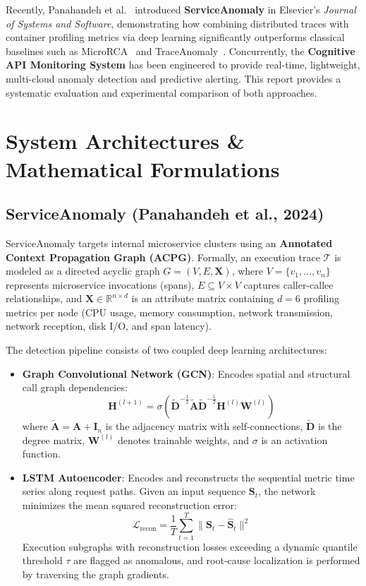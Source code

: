 \documentclass[11pt,a4paper]{article}
\begin{document}
Recently, Panahandeh et al.~\cite{panahandeh2024serviceanomaly} introduced \textbf{ServiceAnomaly} in Elsevier's \textit{Journal of Systems and Software}, demonstrating how combining distributed traces with container profiling metrics via deep learning significantly outperforms classical baselines such as MicroRCA~\cite{wu2020microrca} and TraceAnomaly~\cite{liu2020traceanomaly}. Concurrently, the \textbf{Cognitive API Monitoring System} has been engineered to provide real-time, lightweight, multi-cloud anomaly detection and predictive alerting. This report provides a systematic evaluation and experimental comparison of both approaches.

\section{System Architectures \& Mathematical Formulations}

\subsection{ServiceAnomaly (Panahandeh et al., 2024)}
ServiceAnomaly targets internal microservice clusters using an \textbf{Annotated Context Propagation Graph (ACPG)}. Formally, an execution trace $\mathcal{T}$ is modeled as a directed acyclic graph $G = (V, E, \mathbf{X})$, where $V = \{v_1, \dots, v_n\}$ represents microservice invocations (spans), $E \subseteq V \times V$ captures caller-callee relationships, and $\mathbf{X} \in \mathbb{R}^{n \times d}$ is an attribute matrix containing $d = 6$ profiling metrics per node (CPU usage, memory consumption, network transmission, network reception, disk I/O, and span latency).

The detection pipeline consists of two coupled deep learning architectures:
\begin{itemize}[leftmargin=*]
    \item \textbf{Graph Convolutional Network (GCN)}: Encodes spatial and structural call graph dependencies:
    \begin{equation}
        \mathbf{H}^{(l+1)} = \sigma \left( \mathbf{\tilde{D}}^{-\frac{1}{2}} \mathbf{\tilde{A}} \mathbf{\tilde{D}}^{-\frac{1}{2}} \mathbf{H}^{(l)} \mathbf{W}^{(l)} \right)
    \end{equation}
    where $\mathbf{\tilde{A}} = \mathbf{A} + \mathbf{I}_n$ is the adjacency matrix with self-connections, $\mathbf{\tilde{D}}$ is the degree matrix, $\mathbf{W}^{(l)}$ denotes trainable weights, and $\sigma$ is an activation function.
    \item \textbf{LSTM Autoencoder}: Encodes and reconstructs the sequential metric time series along request paths. Given an input sequence $\mathbf{S}_t$, the network minimizes the mean squared reconstruction error:
    \begin{equation}
        \mathcal{L}_{\text{recon}} = \frac{1}{T} \sum_{t=1}^T \lVert \mathbf{S}_t - \mathbf{\hat{S}}_t \rVert^2
    \end{equation}
    Execution subgraphs with reconstruction losses exceeding a dynamic quantile threshold $\tau$ are flagged as anomalous, and root-cause localization is performed by traversing the graph gradients.
\end{itemize}
\end{document}
